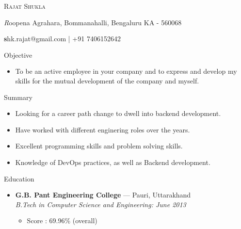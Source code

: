 \documentclass[a4paper,11pt,oneside]{article}
\makeatletter
\newcommand{\name}{Rajat Shukla}
\newcommand{\addr}{Roopena Agrahara, Bommanahalli, Bengaluru KA - 560068}
\newcommand{\contact}{shk.rajat@gmail.com | +91 7406152642}
\newcommand{\bigname}[1]{
  \begin{center}\fontfamily{phv}\selectfont\Huge\scshape#1\end{center}
}
\newcommand{\bignamenew}[1]{
  \begin{center}\selectfont\Huge\scshape#1\end{center}
}
\newcommand{\addrinfo}[1]{
  \begin{center}\selectfont\small\textit#1\end{center}
}
\newcommand{\contactinfo}[1]{
  \begin{center}\selectfont\small\textbf#1\end{center}
}
\newcommand{\resdescpara}[1]{
  \vspace{-5pt}
\item
  #1
}
\newenvironment{ressection}[1]{
  \vspace{4pt}
         {\fontfamily{phv}\selectfont\Large#1}
         \begin{itemize}
           \vspace{3pt}
}{
         \end{itemize}
}
\newcommand{\resitem}[1]{
  \vspace{-4pt}
\item \begin{flushleft} #1 \end{flushleft}
}
\newcommand{\ressubitem}[1]{
  \vspace{-1pt}
\item \begin{flushleft} #1 \end{flushleft}
}
\newcommand{\resbigitem}[3]{
  \vspace{-5pt}
\item
  \textbf{#1} --- #2 \\
  \textit{#3}
}
\newenvironment{ressubsec}[3]{
  \resbigitem{#1}{#2}{#3}
  \vspace{-2pt}
  \begin{itemize}
}{
  \end{itemize}
}
\makeatother
\begin{document}

\bigname{\name}

\vspace{2 pt}
\addrinfo{\addr}

\contactinfo{\contact}
\vspace{8 pt}


\begin{ressection}{Objective}
  \resdescpara{To be an active employee in your company and to express and develop my skills for the mutual development of the company and myself.}
\end{ressection}


\begin{ressection}{Summary}
  \resitem{Looking for a career path change to dwell into backend development.}
  \resitem{Have worked with different enginering roles over the years.}
  \resitem{Excellent programming skills and problem solving skills.}
  \resitem{Knowledge of DevOps practices, as well as Backend development.}
\end{ressection}



\begin{ressection}{Education}
  \begin{ressubsec}{G.B. Pant Engineering College}{Pauri, Uttarakhand}{B.Tech in Computer Science and Engineering: June 2013}
    \ressubitem{Score : 69.96\% (overall)}
  \end{ressubsec}
\end{ressection}

\end{document}
